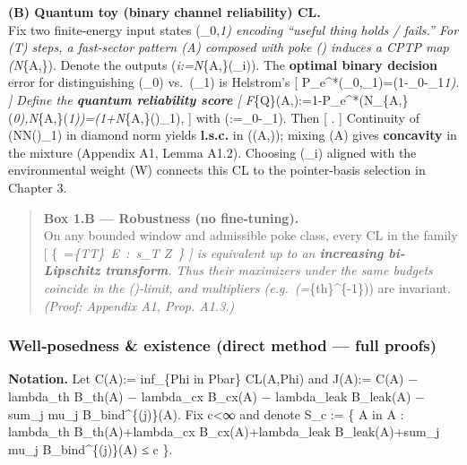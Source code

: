 \documentclass[
]{article}
\numberwithin{equation}{section}
\begin{document}
\textbf{(B) Quantum toy (binary channel reliability) CL.}\\
Fix two finite-energy input states (\rho\_0,\rho\emph{1) encoding
``useful thing holds / fails.'' For (T) steps, a fast-sector pattern (A)
composed with poke (\Phi) induces a CPTP map (\mathcal N}\{A,\Phi\}).
Denote the outputs (\sigma\emph{i:=\mathcal N}\{A,\Phi\}(\rho\_i)). The
\textbf{optimal binary decision} error for distinguishing (\sigma\_0)
vs.~(\sigma\_1) is Helstrom's {[}
P\_e\^{}*(\sigma\_0,\sigma\_1)=\Big(1-\textbar{}\sigma\_0-\sigma\_1\textbar{}\emph{1\Big).
{]} Define the \textbf{quantum reliability score} {[}
F}\{\rm Q\}(A,\Phi):=1-P\_e\^{}*(\mathcal N\_\{A,\Phi\}(\rho\emph{0),\mathcal N}\{A,\Phi\}(\rho\emph{1))=\Big(1+\textbar{}\mathcal N}\{A,\Phi\}(\Delta)\textbar\_1\Big),
{]} with (\Delta:=\rho\_0-\rho\_1). Then {[}
.
{]} Continuity of
(\mathcal N\mapsto \textbar{}\mathcal N(\Delta)\textbar\_1) in diamond
norm yields \textbf{l.s.c.} in ((A,\Phi)); mixing (A) gives
\textbf{concavity} in the mixture (Appendix A1, Lemma A1.2). Choosing
(\rho\_i) aligned with the environmental weight (W) connects this CL to
the pointer-basis selection in Chapter 3.

\begin{quote}
\textbf{Box 1.B --- Robustness (no fine-tuning).}\\
On any bounded window and admissible poke class, every CL in the family
{[}
\Big\{~=\sup\emph{\{T\in\mathscr T\}~\mathbb E~:~s\_T
Z~\Big\}
{]} is equivalent up to an \textbf{increasing bi-Lipschitz transform}.
Thus their maximizers under the same budgets coincide in the
(\Gamma)-limit, and multipliers
(e.g.~(\hbar=\lambda}\{\rm th\}\^{}\{-1\})) are invariant. \emph{(Proof:
Appendix A1, Prop. A1.3.)}
\end{quote}

\hypertarget{wellposedness-existence-direct-method-full-proofs}{%
\subsubsection{Well‑posedness \& existence (direct method --- full
proofs)}\label{wellposedness-existence-direct-method-full-proofs}}

\textbf{Notation.} Let C(A):= inf\_\{Phi in Pbar\} CL(A,Phi) and J(A):=
C(A) − lambda\_th B\_th(A) − lambda\_cx B\_cx(A) − lambda\_leak
B\_leak(A) − sum\_j mu\_j B\_bind\^{}\{(j)\}(A). Fix c\textless∞ and
denote S\_c := \{ A in A : lambda\_th B\_th(A)+lambda\_cx
B\_cx(A)+lambda\_leak B\_leak(A)+sum\_j mu\_j B\_bind\^{}\{(j)\}(A) ≤ c
\}.
\end{document}
